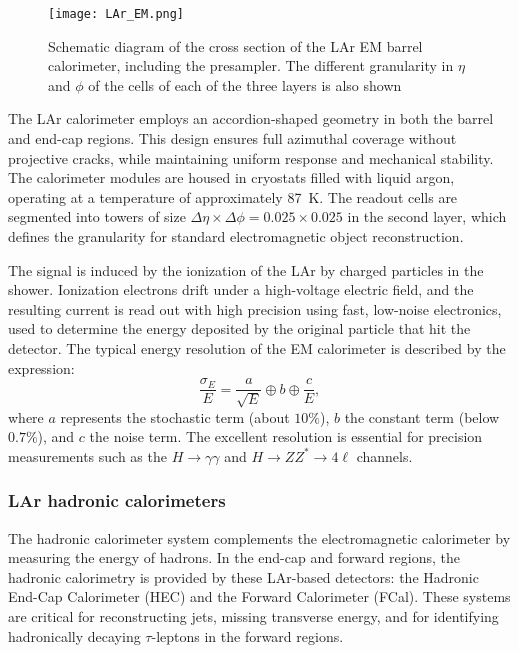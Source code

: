 \begin{figure}[htbp]
    \centering
        \texttt{[image: LAr\_EM.png]}
    \caption{Schematic diagram of the cross section of the LAr EM barrel calorimeter, including the presampler. The different granularity in $\eta$ and $\phi$ of the cells of each of the three layers is also shown~\cite{atlas:EM_LAr}}
    \label{fig:LAr_EM}
\end{figure}

The LAr calorimeter employs an accordion-shaped geometry in both the barrel and end-cap regions. This design ensures full azimuthal coverage without projective cracks, while maintaining uniform response and mechanical stability. The calorimeter modules are housed in cryostats filled with liquid argon, operating at a temperature of approximately 87~K. The readout cells are segmented into towers of size $\Delta\eta \times \Delta\phi = 0.025 \times 0.025$ in the second layer, which defines the granularity for standard electromagnetic object reconstruction.

The signal is induced by the ionization of the LAr by charged particles in the shower. Ionization electrons drift under a high-voltage electric field, and the resulting current is read out with high precision using fast, low-noise electronics, used to determine the energy deposited by the original particle that hit the detector. The typical energy resolution of the EM calorimeter is described by the expression:
\begin{equation}
\frac{\sigma_E}{E} = \frac{a}{\sqrt{E}} \oplus b \oplus \frac{c}{E},
\end{equation}
where $a$ represents the stochastic term (about $10\%$), $b$ the constant term (below $0.7\%$), and $c$ the noise term. The excellent resolution is essential for precision measurements such as the $H \rightarrow \gamma\gamma$ and $H \rightarrow ZZ^* \rightarrow 4\ell$ channels.

\subsubsection{LAr hadronic calorimeters}
\label{sec:elehad}

The hadronic calorimeter system complements the electromagnetic calorimeter by measuring the energy of hadrons. In the end-cap and forward regions, the hadronic calorimetry is provided by these LAr-based detectors: the Hadronic End-Cap Calorimeter (HEC) and the Forward Calorimeter (FCal). These systems are critical for reconstructing jets, missing transverse energy, and for identifying hadronically decaying $\tau$-leptons in the forward regions.

